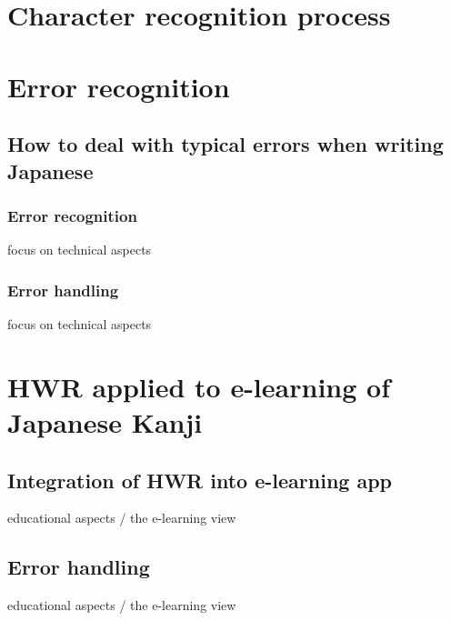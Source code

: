 \section{Character recognition process}

\section{Error recognition}
\subsection{How to deal with typical errors when writing Japanese}
\subsubsection{Error recognition}
focus on technical aspects
\subsubsection{Error handling}
focus on technical aspects

\section{HWR applied to e-learning of Japanese Kanji}
\subsection{Integration of HWR into e-learning app}
educational aspects / the e-learning view
\subsection{Error handling}
educational aspects / the e-learning view

